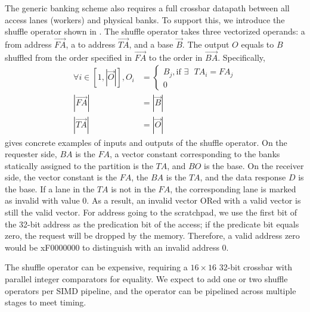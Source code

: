 The generic banking scheme also requires a full crossbar datapath between all access lanes (workers) and
physical banks. To support this, we introduce the shuffle operator shown in .
The shuffle operator takes three vectorized operands: a from address $\overrightarrow{FA}$, a to address
$\overrightarrow{TA}$, and a base $\overrightarrow{B}$.
The output $O$ equals to $B$ shuffled from the order specified in $\overrightarrow{FA}$ to the order in
$\overrightarrow{BA}$. 
Specifically,
\begin{align}
\forall i \in [1,|\overrightarrow{O}|],
O_i &= \begin{cases}
B_j, \text{if $\exists$ $TA_i = FA_j$}\\
0
\end{cases} \\
|\overrightarrow{FA}| &= |\overrightarrow{B}| \\
|\overrightarrow{TA}| &= |\overrightarrow{O}|
\end{align}
 gives concrete examples of inputs and outputs of the shuffle operator.
On the requester side, $BA$ is the $FA$, a vector constant corresponding to the banks statically
assigned to the partition is the $TA$, and $BO$ is the base.
On the receiver side, the vector constant is the $FA$, the $BA$ is the $TA$, and the data response
$D$ is the base.
If a lane in the $TA$ is not in the $FA$, the corresponding lane is marked as invalid with value
$0$. As a result, an invalid vector ORed with a valid vector is still the valid vector.
For address going to the scratchpad, we use the first bit of the 32-bit address as the predication
bit of the access; if the predicate bit equals zero, the request will be dropped by the memory.
Therefore, a valid address zero would be xF0000000 to distinguish with an invalid address 0.

The shuffle operator can be expensive, requiring a $16\times16$ 32-bit crossbar with parallel
integer comparators for equality. We expect to add one or two shuffle operators per SIMD pipeline,
and the operator can be pipelined across multiple stages to meet timing.
